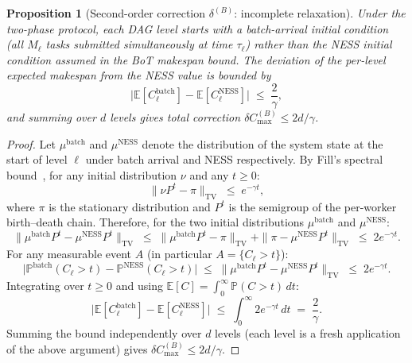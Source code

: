 \documentclass[11pt,a4paper]{article}
\newtheorem{proposition}[theorem]{Proposition}
\begin{document}
\begin{proposition}[Second-order correction $\delta^{(B)}$: incomplete relaxation]
\label{prop:dag_2B}
Under the two-phase protocol, each DAG level starts with a batch-arrival
initial condition (all $M_\ell$ tasks submitted simultaneously at time
$\tau_\ell$) rather than the NESS initial condition assumed in the
BoT makespan bound.
The deviation of the per-level expected makespan from the NESS value is
bounded by
\begin{equation}\label{eq:dag_relax}
  \bigl|\mathbb{E}[C_\ell^{\mathrm{batch}}]
  - \mathbb{E}[C_\ell^{\mathrm{NESS}}]\bigr|
  \;\leq\;
  \frac{2}{\gamma},
\end{equation}
and summing over $d$ levels gives total correction
$\delta C_{\max}^{(B)} \leq 2d/\gamma$.
\end{proposition}

\begin{proof}
Let $\mu^{\mathrm{batch}}$ and $\mu^{\mathrm{NESS}}$ denote the
distribution of the system state at the start of level $\ell$ under
batch arrival and NESS respectively.
By Fill's spectral bound~\cite{fill1991}, for any initial distribution
$\nu$ and any $t \geq 0$:
\[
  \|\nu P^t - \pi\|_{\mathrm{TV}} \;\leq\; e^{-\gamma t},
\]
where $\pi$ is the stationary distribution and $P^t$ is the semigroup
of the per-worker birth--death chain.
Therefore, for the two initial distributions $\mu^{\mathrm{batch}}$
and $\mu^{\mathrm{NESS}}$:
\[
  \|\mu^{\mathrm{batch}} P^t - \mu^{\mathrm{NESS}} P^t\|_{\mathrm{TV}}
  \;\leq\;
  \|\mu^{\mathrm{batch}} P^t - \pi\|_{\mathrm{TV}}
  + \|\pi - \mu^{\mathrm{NESS}} P^t\|_{\mathrm{TV}}
  \;\leq\; 2e^{-\gamma t}.
\]
For any measurable event $A$ (in particular $A = \{C_\ell > t\}$):
\[
  \bigl|
    \mathbb{P}^{\mathrm{batch}}(C_\ell > t)
    - \mathbb{P}^{\mathrm{NESS}}(C_\ell > t)
  \bigr|
  \;\leq\;
  \|\mu^{\mathrm{batch}} P^t - \mu^{\mathrm{NESS}} P^t\|_{\mathrm{TV}}
  \;\leq\; 2e^{-\gamma t}.
\]
Integrating over $t \geq 0$ and using
$\mathbb{E}[C] = \int_0^\infty \mathbb{P}(C > t)\,dt$:
\[
  \bigl|\mathbb{E}[C_\ell^{\mathrm{batch}}]
  - \mathbb{E}[C_\ell^{\mathrm{NESS}}]\bigr|
  \;\leq\;
  \int_0^\infty 2e^{-\gamma t}\,dt
  \;=\; \frac{2}{\gamma}.
\]
Summing the bound independently over $d$ levels (each level is a
fresh application of the above argument) gives $\delta C_{\max}^{(B)} \leq 2d/\gamma$.
\end{proof}
\end{document}
